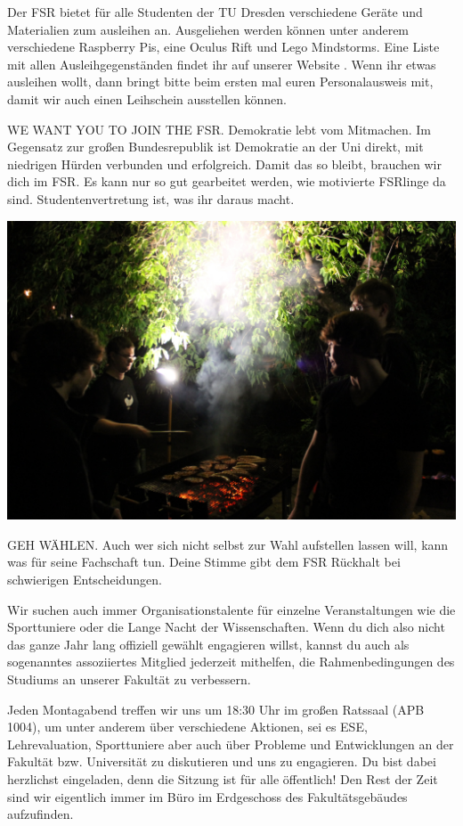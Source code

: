 Der FSR bietet für alle Studenten der TU Dresden verschiedene Geräte und Materialien zum ausleihen an. Ausgeliehen werden können unter anderem verschiedene Raspberry Pis, eine Oculus Rift und Lego Mindstorms. Eine Liste mit allen Ausleihgegenständen findet ihr auf unserer Website . Wenn ihr etwas ausleihen wollt, dann bringt bitte beim ersten mal euren Personalausweis mit, damit wir auch einen Leihschein ausstellen können.

WE WANT YOU TO JOIN THE FSR.
Demokratie lebt vom Mitmachen.
Im Gegensatz zur großen Bundesrepublik ist Demokratie an der Uni direkt, mit niedrigen Hürden verbunden und erfolgreich.
Damit das so bleibt, brauchen wir dich im FSR.
Es kann nur so gut gearbeitet werden, wie motivierte FSRlinge da sind.
Studentenvertretung ist, was ihr daraus macht.

\includegraphics[width=\linewidth]{img/ese2013/grillen.jpg}

GEH WÄHLEN.
Auch wer sich nicht selbst zur Wahl aufstellen lassen will, kann was für seine Fachschaft tun.
Deine Stimme gibt dem FSR Rückhalt bei schwierigen Entscheidungen.

Wir suchen auch immer Organisationstalente für einzelne Veranstaltungen wie die Sporttuniere oder die Lange Nacht der Wissenschaften.
Wenn du dich also nicht das ganze Jahr lang offiziell gewählt engagieren willst, kannst du auch als sogenanntes assoziiertes Mitglied jederzeit mithelfen, die Rahmenbedingungen des Studiums an unserer Fakultät zu verbessern.

Jeden Montagabend treffen wir uns um 18:30 Uhr im großen Ratssaal (APB 1004), um unter anderem über verschiedene Aktionen, sei es ESE, Lehrevaluation, Sporttuniere aber auch über Probleme und Entwicklungen an der Fakultät bzw. Universität zu diskutieren und uns zu engagieren.
Du bist dabei herzlichst eingeladen, denn die Sitzung ist für alle öffentlich!
Den Rest der Zeit sind wir eigentlich immer im Büro im Erdgeschoss des Fakultätsgebäudes aufzufinden.

